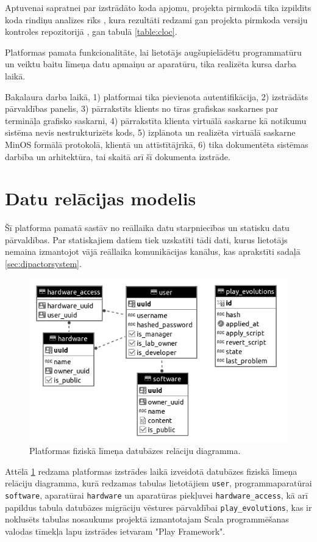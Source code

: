 Aptuvenai sapratnei par izstrādāto koda apjomu, projekta pirmkodā tika izpildīts
koda rindiņu analīzes rīks \cite{AlDanialCloc}, kura rezultāti redzami gan projekta
pirmkoda versiju kontroles repozitorijā \cite{VeinbahsKrisjanisTestbed}, gan tabulā
\ref{table:cloc}.

Platformas pamata funkcionalitāte, lai lietotājs augšupielādētu programmatūru un
veiktu baitu līmeņa datu apmaiņu ar aparatūru, tika realizēta kursa darba laikā.

Bakalaura darba laikā, 1) platformai tika pievienota autentifikācija, 2)
izstrādāts pārvaldības panelis, 3) pārrakstīts klients no tīras grafiskas
saskarnes par termināļa grafisko saskarni, 4) pārrakstīta klienta virtuālā
saskarne kā notikumu sistēma nevis nestrukturizēts kods, 5) izplānota un
realizēta virtuālā saskarne MinOS formālā protokolā, klientā un attīstītājrīkā,
6) tika dokumentēta sistēmas darbība un arhitektūra, tai skaitā arī šī dokumenta
izstrāde.

\section{Datu relācijas modelis}
\label{sec:staticdata}

Šī platforma pamatā sastāv no reāllaika datu starpniecības un statisku datu
pārvaldības. Par statiskajiem datiem tiek uzskatīti tādi dati, kurus lietotājs
nemaina izmantojot vājā reāllaika komunikācijas kanālus, kas aprakstīti sadaļā
\ref{sec:dipactorsystem}. 

\begin{figure}[H]
    \includegraphics[width=0.7\linewidth]{assets/physical-er-diagram-gray.png}
    \centering
    \caption{Platformas fiziskā līmeņa datubāzes relāciju diagramma.}
    \label{fig:staticdata}
\end{figure}

Attēlā \ref{fig:staticdata} redzama platformas izstrādes laikā izveidotā
datubāzes fiziskā līmeņa relāciju diagramma, kurā redzamas tabulas lietotājiem
\lstinline!user!, programmaparatūrai \lstinline!software!, aparatūrai
\lstinline!hardware! un aparatūras piekļuvei \lstinline!hardware_access!, kā arī
papildus tabula datubāzes migrāciju vēstures pārvaldībai
\lstinline!play_evolutions!, kas ir noklusēts tabulas nosaukums projektā
izmantotajam Scala programmēšanas valodas tīmekļa lapu izstrādes ietvaram "Play
Framework".

